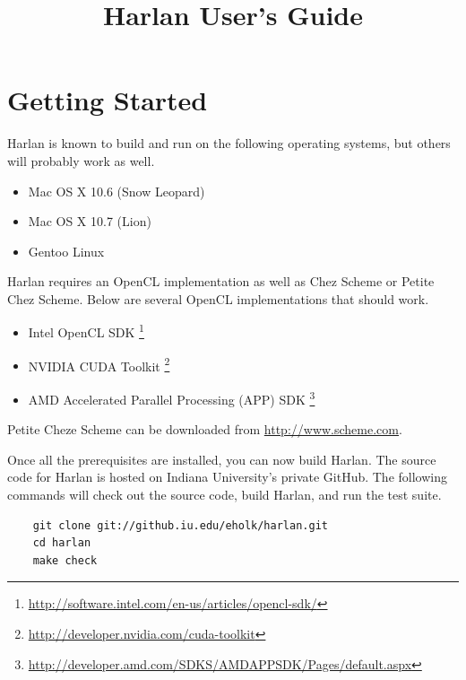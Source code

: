 \documentclass[oneside]{report}
\begin{document}

\title{Harlan User's Guide}

\maketitle

\tableofcontents

\chapter{Getting Started}

Harlan is known to build and run on the following operating systems,
but others will probably work as well.

\begin{itemize}
\item Mac OS X 10.6 (Snow Leopard)
\item Mac OS X 10.7 (Lion)
\item Gentoo Linux
\end{itemize}

Harlan requires an OpenCL implementation as well as Chez Scheme or
Petite Chez Scheme. Below are several OpenCL implementations that
should work.

\begin{itemize}
\item Intel OpenCL SDK
  \footnote{\url{http://software.intel.com/en-us/articles/opencl-sdk/}}
\item NVIDIA CUDA Toolkit
  \footnote{\url{http://developer.nvidia.com/cuda-toolkit}}
\item AMD Accelerated Parallel Processing (APP) SDK
  \footnote{\url{http://developer.amd.com/SDKS/AMDAPPSDK/Pages/default.aspx}}
\end{itemize}

Petite Cheze Scheme can be downloaded from
\url{http://www.scheme.com}.

Once all the prerequisites are installed, you can now build
Harlan. The source code for Harlan is hosted on Indiana University's
private GitHub. The following commands will check out the source code,
build Harlan, and run the test suite.

\begin{verbatim}
    git clone git://github.iu.edu/eholk/harlan.git
    cd harlan
    make check
\end{verbatim}
\end{document}
